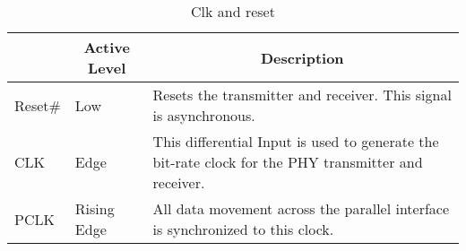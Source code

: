 \begin{table}[H]
    \caption{Clk and reset}
    \centering
  \begin{tabular}{ |m{26mm}|m{10mm}|m{60mm}|  }
\hline
\rowcolor{Gray}
\multicolumn{1}{|c|}{\textbf{Name} } 
& \multicolumn{1}{|c|}{\textbf{Active Level}} 
& \multicolumn{1}{|c|}{\textbf{Description}}\\
\hline
 Reset\# & Low & Resets the transmitter and receiver. This signal
is asynchronous. \\
\hline

 CLK & Edge & This differential Input is used to generate
the bit-rate clock for the PHY transmitter
and receiver.\\
\hline
 PCLK & Rising Edge & All data movement across the parallel
interface is synchronized to this clock.\\
\hline

\end{tabular}
\end{table}


